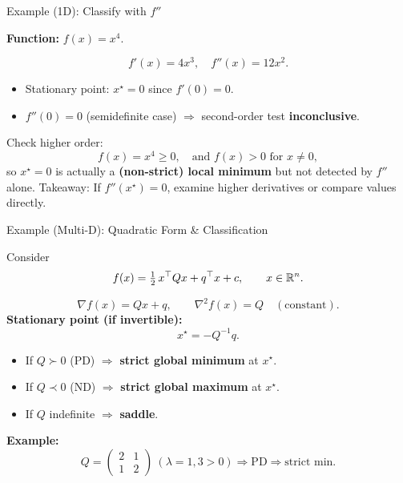 \documentclass[aspectratio=169]{beamer}
\begin{document}
\begin{frame}{Example (1D): Classify with $f''$}

\textbf{Function: } \(f(x)=x^4.\)

\[
f'(x)=4x^3,\quad f''(x)=12x^2.
\]
\pause
\begin{itemize}
  \item Stationary point: \(x^\star=0\) since \(f'(0)=0\).
  \pause
  \item \(f''(0)=0\) (semidefinite case) \(\Rightarrow\) second-order test \textbf{inconclusive}.
  \pause
\end{itemize}
\pause
Check higher order:
\[
f(x)=x^4 \ge 0,\quad \text{and } f(x)>0 \text{ for } x\neq 0,
\]
so \(x^\star=0\) is actually a \textbf{(non-strict) local minimum} but not detected by \(f''\) alone.
\pause
\textcolor{BootcampBlueDark}{Takeaway:} If \(f''(x^\star)=0\), examine higher derivatives or compare values directly.

\end{frame}

\begin{frame}{Example (Multi-D): Quadratic Form \& Classification}

Consider
\[
f(x)=\tfrac12\,x^\top Q x + q^\top x + c, \qquad x\in\mathbb{R}^n.
\vspace{-8mm}
\]

\[
\nabla f(x)=Qx+q,\qquad \nabla^2 f(x)=Q \quad(\text{constant}).
\]
\pause
\textbf{Stationary point (if invertible):}
\[
x^\star = -Q^{-1}q.
\]
\pause
\begin{itemize}
  \item If \(Q\succ 0\) (PD) \(\Rightarrow\) \textbf{strict global minimum} at \(x^\star\).
  \item If \(Q\prec 0\) (ND) \(\Rightarrow\) \textbf{strict global maximum} at \(x^\star\).
  \item If \(Q\) indefinite \(\Rightarrow\) \textbf{saddle}.
\end{itemize}

\textbf{Example:}
\[
Q=\begin{pmatrix}2&1\\1&2\end{pmatrix}\ (\lambda=1,3>0)\Rightarrow \text{PD} \Rightarrow \text{strict min}.
\]

\end{frame}
\end{document}
